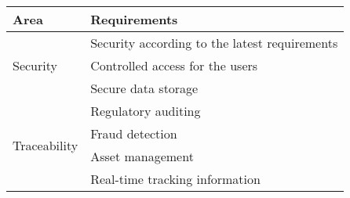 \begin{table}[]
    \centering
    \begin{tabular}{|l|l|}
    \hline
    \textbf{Area}                                                                                              & \textbf{Requirements}                                                                                                              \\ \hline
    \multirow{3}{*}{Security}                                                                                  & Security according to the latest requirements                                                                                      \\ \cline{2-2} 
                                                                                                               & Controlled access for the users                                                                                                    \\ \cline{2-2} 
                                                                                                               & Secure data storage                                                                                                                \\ \hline
    \multirow{4}{*}{Traceability}                                                                              & Regulatory auditing                                                                                                                \\ \cline{2-2} 
                                                                                                               & Fraud detection                                                                                                                    \\ \cline{2-2} 
                                                                                                               & Asset management                                                                                                                   \\ \cline{2-2} 
                                                                                                               & Real-time tracking information                                                                                                     \\ \hline

\end{tabular}
\end{table}
